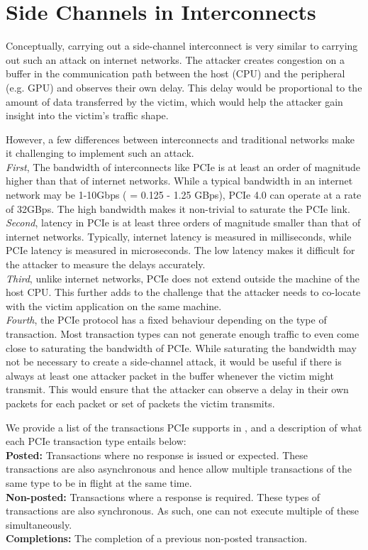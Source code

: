 \section{Side Channels in Interconnects}
\label{sec:interconnect-sc-bg}
Conceptually, carrying out a side-channel interconnect is very similar to carrying out such an attack on internet networks. 
The attacker creates congestion on a buffer in the communication path between the host (CPU) and the peripheral (e.g. GPU) and observes their own delay.
This delay would be proportional to the amount of data transferred by the victim, which would help the attacker gain insight into the victim's traffic shape.

However, a few differences between interconnects and traditional networks make it challenging to implement such an attack. \\
\textit{First}, The bandwidth of interconnects like PCIe is at least an order of magnitude higher than that of internet networks.
While a typical bandwidth in an internet network may be 1-10Gbps ( = 0.125 - 1.25 GBps), PCIe 4.0 can operate at a rate of 32GBps.
The high bandwidth makes it non-trivial to saturate the PCIe link. \\
\textit{Second}, latency in PCIe is at least three orders of magnitude smaller than that of internet networks.
Typically, internet latency is measured in milliseconds, while PCIe latency is measured in microseconds.
The low latency makes it difficult for the attacker to measure the delays accurately. \\
\textit{Third}, unlike internet networks, PCIe does not extend outside the machine of the host CPU.
This further adds to the challenge that the attacker needs to co-locate with the victim application on the same machine. \\
\textit{Fourth}, the PCIe protocol has a fixed behaviour depending on the type of transaction. 
Most transaction types can not generate enough traffic to even come close to saturating the bandwidth of PCIe. 
While saturating the bandwidth may not be necessary to create a side-channel attack, it would be useful if there is always at least one attacker packet in the buffer whenever the victim might transmit.
This would ensure that the attacker can observe a delay in their own packets for each packet or set of packets the victim transmits.

We provide a list of the transactions PCIe supports in , and a description of what each PCIe transaction type entails below: \\
\textbf{Posted:} Transactions where no response is issued or expected. 
These transactions are also asynchronous and hence allow multiple transactions of the same type to be in flight at the same time.\\
\textbf{Non-posted:} Transactions where a response is required. 
These types of transactions are also synchronous.
As such, one can not execute multiple of these simultaneously.\\
\textbf{Completions:} The completion of a previous non-posted transaction.\\

